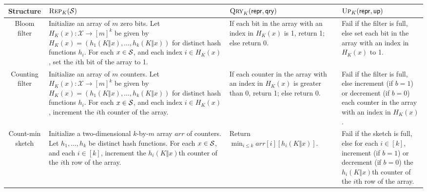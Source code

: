 \begin{table}[thp]
\begin{center}
  \begin{tabular}{ | c | p{4cm} | p{4cm} | p{4cm} | }
    \hline
    Structure & $\textsc{Rep}_K(\mathcal{S})$ & $\textsc{Qry}_K(\mathsf{repr},\mathsf{qry})$ & $\textsc{Up}_K(\mathsf{repr},\mathsf{up})$ \\ \hline
    Bloom filter & Initialize an array of $m$ zero bits. Let $H_K(x): \mathcal{X} \to [m]^k$ be given by $H_K(x) = (h_1(K \Vert x),\ldots,h_k(K \Vert x))$ for distinct hash functions $h_i$. For each $x \in \mathcal{S}$, and each index $i \in H_K(x)$, set the $i$th bit of the array to 1. & If each bit in the array with an index in $H_K(x)$ is 1, return 1; else return 0. & Fail if the filter is full, else set each bit in the array with an index in $H_K(x)$ to 1. \\ \hline
    Counting filter & Initialize an array of $m$ counters. Let $H_K(x): \mathcal{X} \to [m]^k$ be given by $H_K(x) = (h_1(K \Vert x),\ldots,h_k(K \Vert x))$ for distinct hash functions $h_i$. For each $x \in \mathcal{S}$, and each index $i \in H_K(x)$, increment the $i$th counter of the array. & If each counter in the array with an index in $H_K(x)$ is greater than 0, return 1; else return 0. & Fail if the filter is full, else increment (if $b = 1$) or decrement (if $b = 0$) each counter in the array with an index in $H_K(x)$. \\ \hline
    Count-min sketch & Initialize a two-dimensional $k$-by-$m$ array $arr$ of counters. Let $h_1,\ldots,h_k$ be distinct hash functions. For each $x \in \mathcal{S}$, and each $i \in [k]$, increment the $h_i(K \Vert x)$th counter of the $i$th row of the array. & Return $\min_{i \leq k} arr[i][h_i(K \Vert x)]$. & Fail if the sketch is full, else for each $i \in [k]$, increment (if $b = 1$) or decrement (if $b = 0$) the $h_i(K \Vert x)$th counter of the $i$th row of the array. \\ \hline
  \end{tabular}
\end{center}
\end{table}

